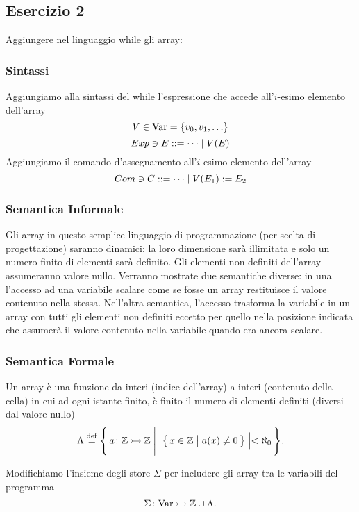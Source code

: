 \subsection{Esercizio 2} 
Aggiungere nel linguaggio while gli array:

\subsubsection{Sintassi}
Aggiungiamo alla sintassi del while l'espressione che accede
all'$i$-esimo elemento dell'array
$$V \in \mathrm{Var} = \{ v_0, v_1, \ldots \}$$
$$Exp \ni E ::= \dots \vbar V(E)$$
Aggiungiamo il comando d'assegnamento all'$i$-esimo elemento
dell'array
$$Com \ni C ::= \dots \vbar V(E_1) := E_2$$

\subsubsection{Semantica Informale}
Gli array in questo semplice linguaggio di programmazione (per scelta
di progettazione) saranno dinamici: la loro dimensione sarà illimitata
e solo un numero finito di elementi sarà definito. Gli elementi non
definiti dell'array assumeranno valore nullo. Verranno mostrate due
semantiche diverse: in una l'accesso ad una
variabile scalare come se fosse un array restituisce il valore
contenuto nella stessa. Nell'altra semantica, l'accesso trasforma la
variabile in un array con tutti gli elementi
non definiti eccetto per quello nella posizione indicata che assumerà
il valore contenuto nella variabile quando era ancora scalare.

\subsubsection{Semantica Formale}
\begin{definizione} 
Un array è una funzione da interi (indice dell'array) a interi
(contenuto della cella) in cui ad ogni istante finito, è finito il
numero di elementi definiti (diversi dal valore nullo)
\[
  \Lambda \defeq \Biggl\{\,
  \pard{a}{\Zset}{\Zset} \Biggm| \Bigm|\bigl\{\, x \in \Zset
  \bigm| a(x) \neq 0 \,\bigr\}\Bigm| < \aleph_0  
  \,\Biggr\}.
\] 
\end{definizione}

\begin{definizione} 
Modifichiamo l'insieme degli store $\Sigma$ per includere gli array tra
le variabili del programma
\[
  \mathord{\Sigma}\colon\mathrm{Var}\rightarrowtail\mathbb{Z} \cup \Lambda.
\]
\end{definizione}

